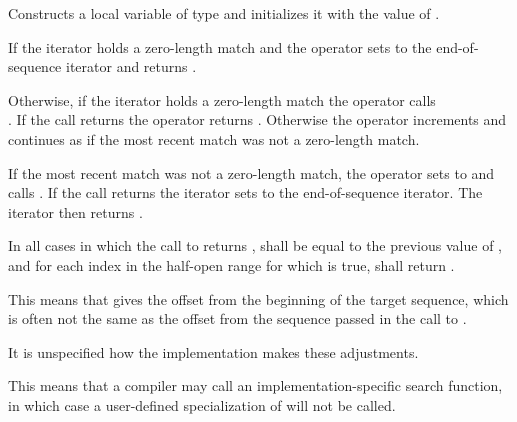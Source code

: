 \begin{itemdescr}
\pnum
\effects  Constructs a local variable  of type  and
initializes it with the value of .

\pnum
If the iterator holds a zero-length match and  the operator
sets  to the end-of-sequence iterator and returns .

\pnum
{}%
%
Otherwise, if the iterator holds a zero-length match the operator calls
\\. If the call returns  the operator
returns . Otherwise the operator increments  and continues as if
the most recent match was not a zero-length match.

\pnum
{}%
If the most recent match was not a zero-length match, the operator sets
 to  and 
calls . If the call returns
 the iterator sets  to the end-of-sequence iterator. The
iterator then returns .

\pnum
In all cases in which the call to  returns ,
 shall be equal to the previous value of
, and for each index  in the half-open range
\tcode{[0, match.size())} for which  is true,
shall return .

\pnum
\begin{note} This means that  gives the
offset from the beginning of the target sequence, which is often not
the same as the offset from the sequence passed in the call
to . \end{note}

\pnum
It is unspecified how the implementation makes these adjustments.

\pnum
\begin{note} This means that a compiler may call an
implementation-specific search function, in which case a user-defined
specialization of  will not be
called. \end{note}
\end{itemdescr}

